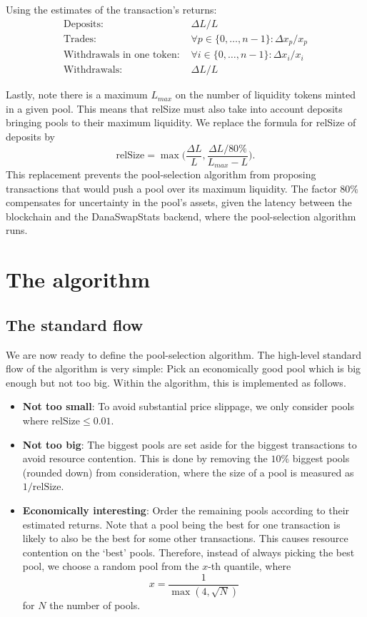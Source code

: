 \documentclass[12pt]{article}
\begin{document}
Using the estimates of the transaction's returns:
\begin{equation*}
  \begin{split}
    \text{Deposits: } &\Delta L / L \\
    \text{Trades: } &\forall p \in \{0, \ldots, n-1\}: \Delta x_p / x_p \\
    \text{Withdrawals in one token: } &\forall i \in \{0, \ldots, n-1\}: \Delta x_i / x_i \\
    \text{Withdrawals: } &\Delta L / L
  \end{split}
\end{equation*}

Lastly, note there is a maximum $L_{max}$ on the number of liquidity tokens
minted in a given pool.
This means that relSize must also take into account deposits bringing pools to
their maximum liquidity.
We replace the formula for relSize of deposits by
$$ \text{relSize} = \max\Big( \frac{\Delta L}{L}, \frac{\Delta L / 80\%}{L_{max}
- L} \Big). $$
This replacement prevents the pool-selection algorithm from proposing transactions
that would push a pool over its maximum liquidity.
The factor $80\%$ compensates for uncertainty in the pool's assets, given
the latency between the blockchain and the DanaSwapStats backend, where the pool-selection algorithm runs.

\section{The algorithm}

\subsection{The standard flow}

We are now ready to define the pool-selection algorithm.
The high-level standard flow of the algorithm is very simple:
Pick an economically good pool which is big enough but not too big.
Within the algorithm, this is implemented as follows.

\begin{itemize}
  \item \textbf{Not too small}: To avoid substantial price slippage, we only
    consider pools where $\text{relSize} \leq 0.01$.
  \item \textbf{Not too big}: The biggest pools are set aside for the biggest
    transactions to avoid resource contention. This is done by removing the
    $10\%$ biggest pools (rounded down) from consideration, where the size of a
    pool is measured as $1 / \text{relSize}$.
  \item \textbf{Economically interesting}:
    Order the remaining pools according to their estimated returns.
    Note that a pool being the best for one transaction is likely to also be the
    best for some other transactions.
    This causes resource contention on the `best' pools.
    Therefore, instead of always picking the best pool, we choose a random pool
    from the $x$-th quantile, where
    $$ x = \frac{1}{\max(4, \sqrt{N})} $$ for $N$ the number of pools.
\end{itemize}
\end{document}
